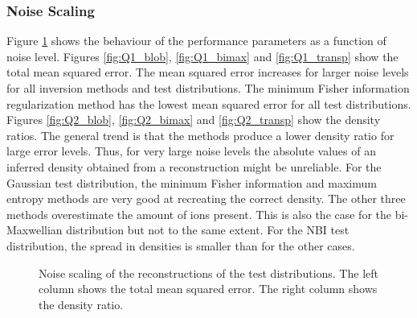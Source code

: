\subsubsection{Noise Scaling}
Figure \ref{fig:Qfigs_tomos} shows the behaviour of the performance parameters as a function of noise level. Figures \ref{fig:Q1_blob}, \ref{fig:Q1_bimax} and \ref{fig:Q1_transp} show the total mean squared error.
The mean squared error increases for larger noise levels for all inversion methods and test distributions. 
The minimum Fisher information regularization method has the lowest mean squared error for all test distributions. 
Figures \ref{fig:Q2_blob}, \ref{fig:Q2_bimax} and \ref{fig:Q2_transp} show the density ratios. The general trend is that the methods produce a lower density ratio for large error levels. Thus, for very large noise levels the absolute values of an inferred density obtained from a reconstruction might be unreliable. For the Gaussian test distribution, the minimum Fisher information and maximum entropy methods are very good at recreating the correct density. The other three methods overestimate the amount of ions present. This is also the case for the bi-Maxwellian distribution but not to the same extent. 
For the NBI test distribution, the spread in densities is smaller than for the other cases.
\begin{figure}
    \centering
    \caption{Noise scaling of the reconstructions of the test distributions. The left column shows the total mean squared error. The right column shows the density ratio. }
    \label{fig:Qfigs_tomos}
\end{figure}

